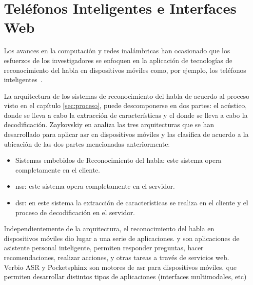\section{Tel\'efonos Inteligentes e Interfaces Web}
\label{sec:smartphones}

Los avances en la computaci\'on y redes inal\'ambricas han ocasionado
que los esfuerzos de los investigadores se enfoquen en la aplicaci\'on de tecnolog\'ias de
reconocimiento del habla en dispositivos m\'oviles como, por ejemplo, los tel\'efonos 
\mbox{inteligentes \cite{TanAutomatic2008}}.

La arquitectura de los sistemas de reconocimiento del habla de acuerdo al proceso visto en el 
cap\'itulo \ref{sec:proceso}, puede descomponerse en dos partes: el  ac\'ustico,
donde se lleva a cabo la extracci\'on de caracter\'isticas  y el  donde se 
lleva a cabo la decodificaci\'on. 
Zaykovskiy en \cite{ZaykovskiySurvey2006} analiza las tres arquitecturas que se han desarrollado
para aplicar \gls{asr} en dispositivos m\'oviles y las clasifica de acuerdo a la ubicaci\'on de las dos partes
mencionadas anteriormente:

\begin{itemize}
    \item Sistemas embebidos de Reconocimiento del habla: este sistema opera completamente en el cliente.
    \item \gls{nsr}: este sistema opera completamente en el servidor. 
    \item \gls{dsr}: en este sistema la extracci\'on de caracter\'isticas se realiza
        en el cliente y el proceso de decodificaci\'on en el servidor.
\end{itemize}

Independientemente de la arquitectura, el reconocimiento del habla en dispositivos m\'oviles dio lugar a una 
serie de aplicaciones.  \cite{AppleSiri, OneAccordSiri} y  \cite{GoogleNow} 
son aplicaciones de asistente personal inteligente, permiten responder preguntas,
hacer recomendaciones, realizar acciones, y otras tareas a trav\'es de servicios web. Verbio ASR \cite{VerbioASR} y 
Pocketsphinx \cite{HugginsDainesPocketSphinx2006, PocketSphinxHomePage} son motores de \gls{asr} para dispositivos
m\'oviles, que permiten desarrollar distintos tipos de aplicaciones (interfaces multimodales, etc)

